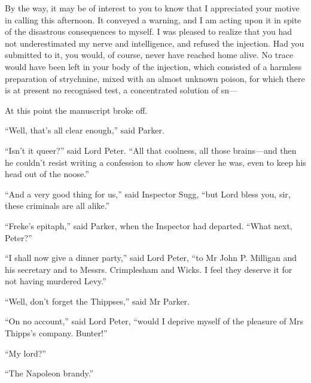 By the way, it may be of interest to you to know that I appreciated your motive in calling this afternoon. It conveyed a warning, and I am acting upon it in spite of the disastrous consequences to myself. I was pleased to realize that you had not underestimated my nerve and intelligence, and refused the injection. Had you submitted to it, you would, of course, never have reached home alive. No trace would have been left in your body of the injection, which consisted of a harmless preparation of strychnine, mixed with an almost unknown poison, for which there is at present no recognised test, a concentrated solution of sn---

At this point the manuscript broke off.

\enquote{Well, that’s all clear enough,} said Parker.

\enquote{Isn’t it queer?} said Lord Peter. \enquote{All that coolness, all those brains\allowbreak---\allowbreak and then he couldn’t resist writing a confession to show how clever he was, even to keep his head out of the noose.}

\enquote{And a very good thing for us,} said Inspector Sugg, \enquote{but Lord bless you, sir, these criminals are all alike.}

\enquote{Freke’s epitaph,} said Parker, when the Inspector had departed. \enquote{What next, Peter?}

\enquote{I shall now give a dinner party,} said Lord Peter, \enquote{to Mr John P. Milligan and his secretary and to Messrs. Crimplesham and Wicks. I feel they deserve it for not having murdered Levy.}

\enquote{Well, don’t forget the Thippses,} said Mr Parker.

\enquote{On no account,} said Lord Peter, \enquote{would I deprive myself of the pleasure of Mrs Thipps’s company. Bunter!}

\enquote{My lord?}

\enquote{The Napoleon brandy.}

